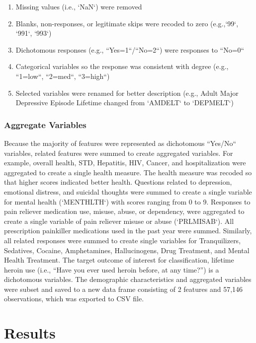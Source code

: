 \documentclass[sigconf]{acmart}
\begin{document}
\begin{enumerate}
  \item Missing values (i.e., `NaN`) were removed 
  \item Blanks, non-responses, or legitimate skips were recoded to zero 
  (e.g.,`99`, `991`, `993`) 
  \item Dichotomous responses (e.g., ``Yes=1``/``No=2``) were responses to 
  ``No=0``
  \item Categorical variables so the response was consistent with degree 
  (e.g., ``1=low``, ``2=med``, ``3=high``)
   \item Selected variables were renamed for better description (e.g., 
   Adult Major Depressive Episode Lifetime changed from `AMDELT` to `DEPMELT`)
\end{enumerate}

\subsubsection{Aggregate Variables}
Because the majority of features were represented as dichotomous ``Yes/No`` 
variables, related features were summed to create aggregated variables. For 
example, overall health, STD, Hepatitis, HIV, Cancer, and hospitalization were 
aggregated to create a single health measure. The health measure was recoded
so that higher scores indicated better health. Questions related to depression, 
emotional distress, and suicidal thoughts were summed to create a single 
variable for mental health (`MENTHLTH`) with scores ranging from 0 to 9. 
Responses to pain reliever medication use, misuse, abuse, or dependency, 
were aggregated to create a single variable of pain reliever misuse or abuse
(`PRLMISAB`). All prescription painkiller medications used in the past year
were summed. Similarly, all related responses were summed to create single 
variables for Tranquilizers, Sedatives, Cocaine, Amphetamines, Hallucinogens, 
Drug Treatment, and Mental Health Treatment. The target outcome of interest for 
classification, lifetime heroin use (i.e., ``Have you ever used heroin before, 
at any time?'') is a dichotomous variables. The demographic characteristics 
and aggregated variables were subset and saved to a new data frame consisting 
of 2 features and 57,146 observations, which was exported to CSV file. 


\section{Results}
\end{document}

